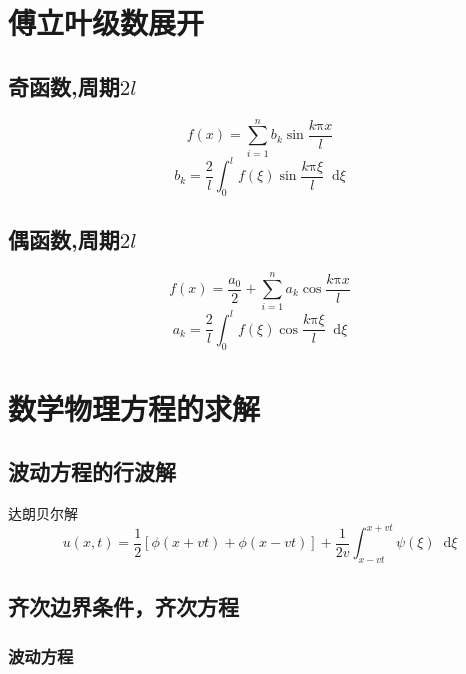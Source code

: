 \documentclass{article}
\newcommand*{\md}{\mathop{}\!\mathrm{d}}
\begin{document}
\section{傅立叶级数展开}

\subsection{奇函数,周期$2l$}

\begin{equation*}
  f(x) = \sum\limits_{i=1}^{n}b_{k} \sin \dfrac{k \mathrm{\pi} x}{l} 
\end{equation*}
\begin{equation*}
  b_{k} = \dfrac{2}{l} \int_{0}^{l} f(\xi) \sin \dfrac{k \mathrm{\pi} \xi}{l} \md \xi 
\end{equation*}
\subsection{偶函数,周期$2l$}

\begin{equation*}
  f(x) = \dfrac{a_{0}}{2} + \sum\limits_{i=1}^{n}a_{k} \cos \dfrac{k \mathrm{\pi} x}{l} 
\end{equation*}
\begin{equation*}
  a_{k} = \dfrac{2}{l} \int_{0}^{l} f(\xi) \cos \dfrac{k \mathrm{\pi} \xi}{l} \md \xi 
\end{equation*}

\section{数学物理方程的求解}
\subsection{波动方程的行波解}

达朗贝尔解
\begin{equation*}
  u(x,t) = \dfrac{1}{2} \left[ \phi (x + vt) + \phi (x - vt) \right] + \dfrac{1}{2v} \int_{x-vt}^{x+vt} \psi(\xi) \md \xi
\end{equation*}


\subsection{齐次边界条件，齐次方程}

\subsubsection{波动方程}
\end{document}
